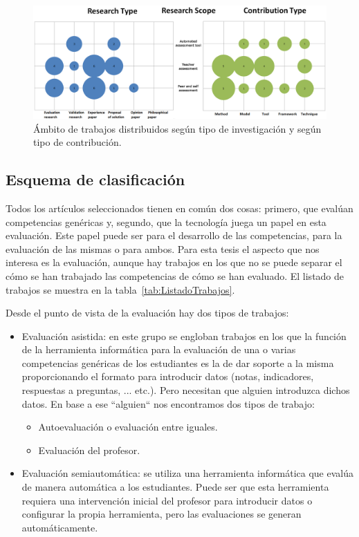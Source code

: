 \pagestyle{empty}
\begin{landscape}
\begin{figure}[h]
  \begin{center}
    \includegraphics[scale=0.4]{Burbujas.png}
  \end{center}
  \caption{Ámbito de trabajos distribuidos según tipo de investigación y según tipo de contribución.}
  \label{fig:Burble}
\end{figure}
\end{landscape}
\pagestyle{fancy}


\subsection{Esquema de clasificación}

Todos los artículos seleccionados tienen en común dos cosas: primero, que evalúan competencias genéricas y, segundo, que la tecnología juega un papel en esta evaluación. Este papel puede ser para el desarrollo de las competencias, para la evaluación de las mismas o para ambos. Para esta tesis el aspecto que nos interesa es la evaluación, aunque hay trabajos en los que no se puede separar el cómo se han trabajado las competencias de cómo se han evaluado. El listado de trabajos se muestra en la tabla~\ref{tab:ListadoTrabajos}.

Desde el punto de vista de la evaluación hay dos tipos de trabajos:
\begin{itemize}
\item Evaluación asistida: en este grupo se engloban trabajos en los que la función de la herramienta informática para la evaluación de una o varias competencias genéricas de los estudiantes es la de dar soporte a la misma proporcionando el formato para introducir datos (notas, indicadores, respuestas a preguntas, ... etc.). Pero necesitan que alguien introduzca dichos datos. En base a ese ``alguien`` nos encontramos dos tipos de trabajo:
	\begin{itemize}
		\item Autoevaluación o evaluación entre iguales.
		\item Evaluación del profesor.
	\end{itemize}
\item Evaluación semiautomática:  se utiliza una herramienta informática que evalúa de manera automática a los estudiantes. Puede ser que esta herramienta requiera una intervención inicial del profesor para introducir datos o configurar la propia herramienta, pero las evaluaciones se generan automáticamente.
\end{itemize}

